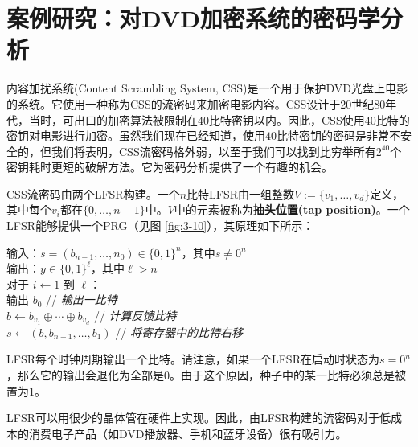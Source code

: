 \section{案例研究：对DVD加密系统的密码学分析}\label{sec:3-8}

内容加扰系统(Content Scrambling System, CSS)是一个用于保护DVD光盘上电影的系统。它使用一种称为CSS的流密码来加密电影内容。CSS设计于20世纪80年代，当时，可出口的加密算法被限制在$40$比特密钥以内。因此，CSS使用$40$比特的密钥对电影进行加密。虽然我们现在已经知道，使用$40$比特密钥的密码是非常不安全的，但我们将表明，CSS流密码格外弱，以至于我们可以找到比穷举所有$2^{40}$个密钥耗时更短的破解方法。它为密码分析提供了一个有趣的机会。

\begin{snote}
CSS流密码由两个LFSR构建。一个$n$比特LFSR由一组整数$V:=\{v_1,\dots,v_d\}$定义，其中每个$v_i$都在$\{0,\dots,n-1\}$中。$V$中的元素被称为\textbf{抽头位置(tap position)}。一个LFSR能够提供一个PRG（见图 \ref{fig:3-10}），其原理如下所示：

\vspace*{5pt}

\hspace*{5pt} 输入：$s=(b_{n-1},\dots,n_0)\in\{0,1\}^n$，其中$s\neq 0^n$\\
\hspace*{26pt} 输出：$y\in\{0,1\}^\ell$，其中$\ell>n$\\
\hspace*{26pt} 对于 $i\leftarrow1$ 到 $\ell$：\\
\hspace*{26pt} \quad\quad\quad 输出 $b_0$ \hspace*{81.5pt} // \emph{输出一比特}\\
\hspace*{26pt} \quad\quad\quad $b\leftarrow b_{v_1}\oplus\cdots\oplus b_{v_d}$ \hspace*{29.5pt} // \emph{计算反馈比特}\\
\hspace*{26pt} \quad\quad\quad $s\leftarrow(b,b_{n-1},\dots,b_1)$ \hspace*{23pt} // \emph{将寄存器中的比特右移}

\vspace*{5pt}

\noindent
LFSR每个时钟周期输出一个比特。请注意，如果一个LFSR在启动时状态为$s=0^n$，那么它的输出会退化为全部是$0$。由于这个原因，种子中的某一比特必须总是被置为$1$。

LFSR可以用很少的晶体管在硬件上实现。因此，由LFSR构建的流密码对于低成本的消费电子产品（如DVD播放器、手机和蓝牙设备）很有吸引力。
\end{snote}

